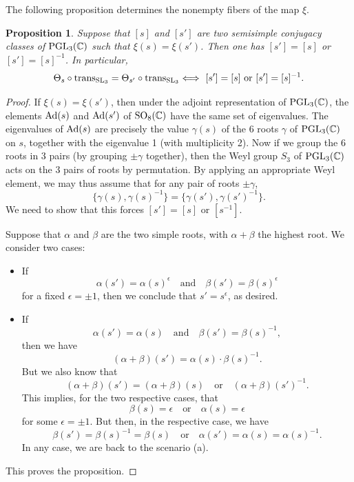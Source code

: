 \documentclass[11pt]{amsart}
\theoremstyle{plain}
\newtheorem{prop}[equation]{Proposition}
\numberwithin{equation}{section}
\newcommand{\C}{\mathbb C}
\def\SL{{\rm SL}}
\def\PGL{{\rm PGL}}
\def\SO{{\rm SO}}
\def\C{{\bf C}}
\def\C{{\mathbb C}}
\begin{document}
The following proposition determines the nonempty fibers of the map $\xi$.
\vskip 5pt

\begin{prop} \label{P:fibers}
Suppose that $[s]$ and $[s']$ are two semisimple conjugacy classes of $\PGL_3(\C)$ such that $\xi(s) = \xi(s')$. Then one has
$[s'] = [s]$ or $[s'] = [s]^{-1}$. In particular, 
\[  \Theta_s \circ {\rm trans}_{\SL_3} = \Theta_{s'} \circ {\rm trans}_{\SL_3} \Longleftrightarrow  \text{ $[s'] = [s]$ or $[s'] = [s]^{-1}$.} \]
\end{prop}
\vskip 5pt

\begin{proof}
 If $\xi(s) = \xi(s')$, then under the adjoint representation of $\PGL_3(\C)$, the elements ${\rm Ad}(s)$ and ${\rm Ad}(s')$ of $\SO_8(\C)$ have the same set of eigenvalues.
The eigenvalues of ${\rm Ad}(s)$  are precisely the value $\gamma(s)$ of the 6 roots $\gamma$ of $\PGL_3(\C)$  on $s$, together with the eigenvalue 1 (with multiplicity 2). Now if we group the 6 roots in 3 pairs (by grouping $\pm \gamma$ together), then the Weyl group $S_3$ of $\PGL_3(\C)$ acts on the 3 pairs  of roots by permutation. By applying an appropriate  Weyl element, we may thus assume that for any pair of roots $\pm \gamma$, 
\[  \{ \gamma(s), \gamma(s)^{-1} \} = \{ \gamma(s') , \gamma(s')^{-1} \}. \]
We need to show that this forces $[s'] = [s]$ or $[s^{-1}]$.
\vskip 5pt

Suppose that $\alpha$ and $\beta$ are the two simple roots, with $\alpha + \beta$ the highest root. We consider two cases:
\vskip 5pt
\begin{itemize}
\item[(a)]  If
\[ \alpha(s') = \alpha(s)^{\epsilon} \quad \text{and} \quad \beta(s') = \beta(s)^{\epsilon} \]
for a fixed $\epsilon = \pm 1$, then we conclude that $s' = s^{\epsilon}$, as desired. 
\vskip 5pt

\item[(b)]  If
\[ \alpha(s') = \alpha(s) \quad \text{and} \quad \beta(s') = \beta(s)^{-1}, \]
then we have
\[  (\alpha + \beta) (s') = \alpha(s) \cdot \beta(s)^{-1}. \]
But we also know that
\[ (\alpha+\beta)(s') = (\alpha + \beta)(s) \quad \text{or} \quad  (\alpha + \beta)(s')^{-1}. \]
This implies, for the two respective cases,  that 
\[  \beta(s) = \epsilon \quad \text{or} \quad  \alpha(s) = \epsilon \]
for some $\epsilon = \pm 1$.  But then, in the respective case,  we have
\[  \beta(s') = \beta(s)^{-1} = \beta(s) \quad \text{or} \quad \alpha(s') = \alpha(s) = \alpha(s)^{-1}. \]
In any case, we are back to the scenario (a). 
\end{itemize}
This proves the proposition.
\end{proof}
\end{document}
